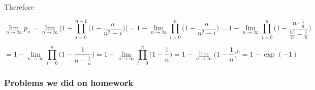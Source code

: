 \documentclass{article}
\newcommand{\E}{\mathbb{E}}
\newcommand{\Var}{\mathrm{Var}}
\begin{document}
Therefore

\[
\lim_{n \to \infty} p_n = \lim_{n \to \infty} \bigg[ 1 - \prod_{i=0}^{n-1}\bigg(1-\frac{n}{n^2 - i} \bigg) \bigg] = 1 - \lim_{n \to \infty} \prod_{i=0}^{n}\bigg(1-\frac{n}{n^2 - i} \bigg) = 1 - \lim_{n \to \infty} \prod_{i=0}^{n}\bigg(1-\frac{n \cdot \frac{1}{n}}{\frac{n^2}{n} - \frac{i}{n}} \bigg)
\]

\[
= 1 - \lim_{n \to \infty} \prod_{i=0}^{n}\bigg(1-\frac{1}{n - \frac{i}{n}} \bigg) = 1 - \lim_{n \to \infty} \prod_{i=0}^{n}\bigg(1-\frac{1}{n} \bigg) = 1 - \lim_{n \to \infty}  \bigg(1 - \frac{1}{n} \bigg)^n = \boxed{1 - \exp(-1)}
\]


\subsubsection{Problems we did on homework}

%
%
%
%
%
%
%
%
%
%
%
%
\end{document}
